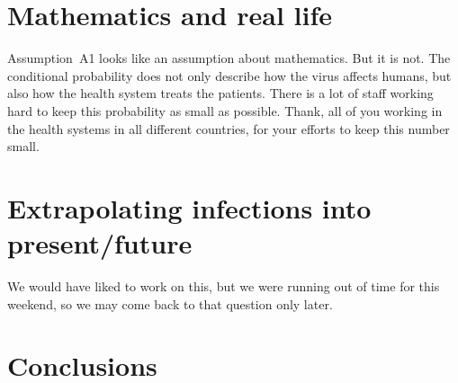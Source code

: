 \documentclass[a4paper]{article}
\begin{document}
\section{Mathematics and real life}
Assumption~A1 looks like an assumption about mathematics. 
But it is not. 
The conditional probability does not 
only describe how
the virus affects humans, 
but also how the health system treats the patients. 
There is a lot of staff working hard to 
keep this probability as small as possible. 
Thank, all of you working in the health systems in all different countries, for 
your efforts to keep this number small. 




\section{Extrapolating infections into present/future}
We would have liked to work on this, but we were running out of time for this weekend, so we may come back to that question only later.

\section{Conclusions}

\begin{center}
\end{center}


\end{document}
